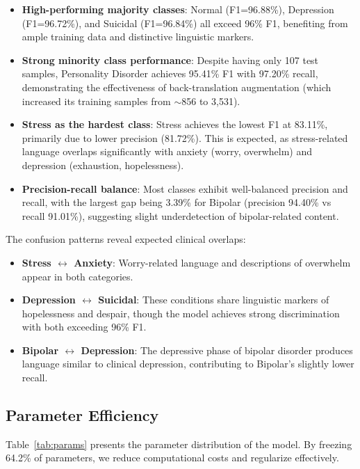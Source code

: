 \documentclass[conference, 10pt]{IEEEtran}
\begin{document}
\begin{itemize}[noitemsep]
    \item \textbf{High-performing majority classes}: Normal (F1=96.88\%), Depression (F1=96.72\%), and Suicidal (F1=96.84\%) all exceed 96\% F1, benefiting from ample training data and distinctive linguistic markers.
    \item \textbf{Strong minority class performance}: Despite having only 107 test samples, Personality Disorder achieves 95.41\% F1 with 97.20\% recall, demonstrating the effectiveness of back-translation augmentation (which increased its training samples from $\sim$856 to 3,531).
    \item \textbf{Stress as the hardest class}: Stress achieves the lowest F1 at 83.11\%, primarily due to lower precision (81.72\%). This is expected, as stress-related language overlaps significantly with anxiety (worry, overwhelm) and depression (exhaustion, hopelessness).
    \item \textbf{Precision-recall balance}: Most classes exhibit well-balanced precision and recall, with the largest gap being 3.39\% for Bipolar (precision 94.40\% vs recall 91.01\%), suggesting slight underdetection of bipolar-related content.
\end{itemize}

The confusion patterns reveal expected clinical overlaps:
\begin{itemize}[noitemsep]
    \item \textbf{Stress $\leftrightarrow$ Anxiety}: Worry-related language and descriptions of overwhelm appear in both categories.
    \item \textbf{Depression $\leftrightarrow$ Suicidal}: These conditions share linguistic markers of hopelessness and despair, though the model achieves strong discrimination with both exceeding 96\% F1.
    \item \textbf{Bipolar $\leftrightarrow$ Depression}: The depressive phase of bipolar disorder produces language similar to clinical depression, contributing to Bipolar's slightly lower recall.
\end{itemize}

\subsection{Parameter Efficiency}

Table~\ref{tab:params} presents the parameter distribution of the model. By freezing 64.2\% of parameters, we reduce computational costs and regularize effectively.
\end{document}
